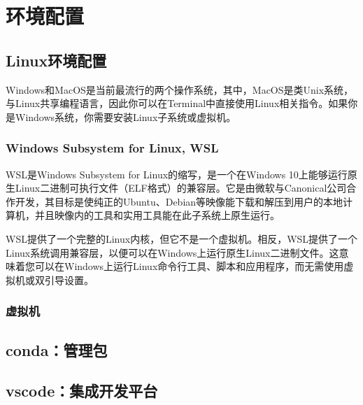 \chapter{环境配置}

\section{Linux环境配置}
Windows和MacOS是当前最流行的两个操作系统，其中，MacOS是类Unix系统，与Linux共享编程语言，因此你可以在Terminal中直接使用Linux相关指令。如果你是Windows系统，你需要安装Linux子系统或虚拟机。

\subsection{Windows Subsystem for Linux, WSL}
WSL是Windows Subsystem for Linux的缩写，是一个在Windows 10上能够运行原生Linux二进制可执行文件（ELF格式）的兼容层。它是由微软与Canonical公司合作开发，其目标是使纯正的Ubuntu、Debian等映像能下载和解压到用户的本地计算机，并且映像内的工具和实用工具能在此子系统上原生运行。

WSL提供了一个完整的Linux内核，但它不是一个虚拟机。相反，WSL提供了一个Linux系统调用兼容层，以便可以在Windows上运行原生Linux二进制文件。这意味着您可以在Windows上运行Linux命令行工具、脚本和应用程序，而无需使用虚拟机或双引导设置。

\begin{quotation}

\end{quotation}

\subsection{虚拟机}

\section{conda：管理包}

\section{vscode：集成开发平台}

